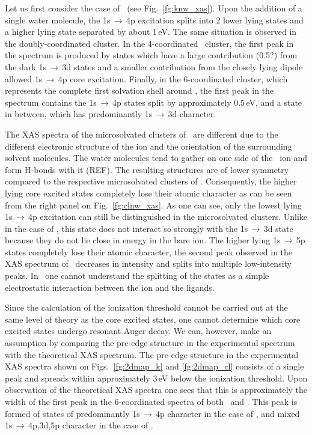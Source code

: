 Let us first consider the case of \ki~(see Fig.\ \ref{fg:knw_xas}). Upon the addition of a single water molecule, the 1s$\,\rightarrow\,$4p excitation splits into 2 lower lying states and a higher lying state separated by about 1\,eV. The same situation is observed in the doubly-coordinated cluster. In the 4-coordinated \ki~cluster, the first peak in the spectrum is produced by states which have a large contribution (0.5?) from the dark 1s$\,\rightarrow\,$3d states and a smaller contribution from the closely lying dipole allowed 1s$\,\rightarrow\,$4p core excitation. Finally, in the 6-coordinated cluster, which represents the complete first solvation shell around \ki, the first peak in the spectrum contains the 1s$\,\rightarrow\,$4p states split by approximately 0.5\,eV, and a state in between, which has predominantly 1s$\,\rightarrow\,$3d character.


The XAS spectra of the microsolvated clusters of \cli~are different due to the different electronic structure of the ion and the orientation of the surrounding solvent molecules. The water molecules tend to gather on one side of the \cli~ion and form H-bonds with it (REF). The resulting structures are of lower symmetry compared to the respective microsolvated clusters of \ki. Consequently, the higher lying core excited states completely lose their atomic character as can be seen from the right panel on Fig.\ \ref{fg:clnw_xas}. As one can see, only the lowest lying 1s$\,\rightarrow\,$4p excitation can still be distinguished in the microsolvated clusters. Unlike in the case of \ki, this state does not interact so strongly with the 1s$\,\rightarrow\,$3d state because they do not lie close in energy in the bare ion. The higher lying 1s$\,\rightarrow\,$5p states completely lose their atomic character, the second peak observed in the XAS spectrum of \cli~decreases in intensity and splits into multiple low-intensity peaks. In \cli~one cannot understand the splitting of the states as a simple electrostatic interaction between the ion and the ligands.

Since the calculation of the ionization threshold cannot be carried out at the same level of theory as the core excited states, one cannot determine which core excited states undergo resonant Auger decay. We can, however,  make an assumption by comparing the pre-edge structure in the experimental spectrum with the theoretical XAS spectrum. The pre-edge structure in the experimental XAS spectra shown on Figs.\ \ref{fg:2dmap_k} and \ref{fg:2dmap_cl} consists of a single peak and spreads within approximately 3\,eV below the ionization threshold. Upon observation of the theoretical XAS spectra one sees that this is approximately the width of the first peak in the 6-coordinated spectra of both \ki~and \cli. This peak is formed of states of predominantly 1s$\,\rightarrow\,$4p character in the case of \cli, and mixed 1s$\,\rightarrow\,$4p,3d,5p character in the case of \ki.


